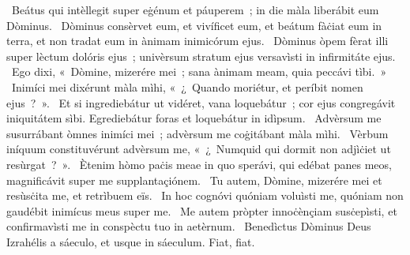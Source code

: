 ~Beátus qui intèllegit super eġénum et páuperem~; in die màla liberábit eum Dòminus. 
~Dòminus consèrvet eum, et vivíficet eum, et beátum fàċiat eum in terra, et non tradat eum in ànimam inimicórum ejus. 
~Dòminus òpem fèrat illi super lèctum dolóris ejus~; univèrsum stratum ejus versavìsti in infirmitáte ejus. 
~Ego dixi, «~Dòmine, mizerére mei~; sana ànimam meam, quia peccávi tìbi.~»
~Inimíci mei dixérunt màla mìhi, «~¿~Quando moriétur, et períbit nomen ejus~?~». 
~Et si ingrediebátur ut vidéret, vana loquebátur~; cor ejus congregávit iniquitátem sìbi. Egrediebátur foras et loquebátur in idìpsum. 
~Advèrsum me susurrábant òmnes inimíci mei~; advèrsum me coġitábant màla mìhi. 
~Vèrbum iníquum constituvérunt advèrsum me, «~¿~Numquid qui dormit non adjìċiet ut resùrgat~?~». 
~Ètenim hòmo paċis meae in quo sperávi, qui edébat panes meos, magnificávit super me supplantaçiónem. 
~Tu autem, Dòmine, mizerére mei et resùsċita me, et retrìbuem eïs. 
~In hoc cognóvi quóniam voluìsti me, quóniam non gaudébit inimícus meus super me. 
~Me autem pròpter innoċènçiam susċepìsti, et confirmavìsti me in conspèctu tuo in aetèrnum. 
~Benedìctus Dòminus Deus Izrahélis a sáeculo, et usque in sáeculum. Fiat, fiat. 
